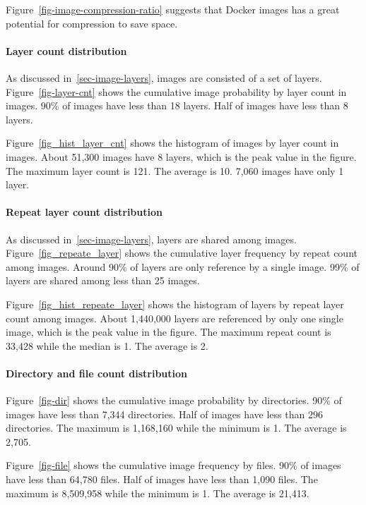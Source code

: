 Figure~\ref{fig-image-compression-ratio} suggests that Docker images has a great potential for compression to save space.
\paragraph{Layer count distribution}



As discussed in~\ref{sec-image-layers}, images are consisted of a set of layers. Figure~\ref{fig-layer-cnt} shows the cumulative image probability by layer count in images. 90\% of images have less than 18 layers. Half of images have less than 8 layers. 

Figure~\ref{fig_hist_layer_cnt} shows the histogram of images by layer count in images. About 51,300 images have 8 layers, which is the peak value in the figure. The maximum layer count is 121. The average is 10. 7,060 images have only 1 layer. 


\paragraph{Repeat layer count distribution}

As discussed in~\ref{sec-image-layers}, layers are shared among images. Figure~\ref{fig_repeate_layer} shows the cumulative layer frequency by repeat count among images. Around 90\% of layers are only reference by a single image. 99\% of layers are shared among less than 25 images. 

Figure~\ref{fig_hist_repeate_layer} shows the histogram of layers by repeat layer count among images. About 1,440,000 layers are referenced by only one single image, which is the peak value in the figure. The maximum repeat count is 33,428 while the median is 1. The average is 2.
\paragraph{Directory and file count distribution}



Figure~\ref{fig-dir} shows the cumulative image probability by directories. 90\% of images have less than 7,344 directories. Half of images have less than 296 directories. The maximum is 1,168,160 while the minimum is 1. The average is 2,705. 

Figure~\ref{fig-file} shows the cumulative image frequency by files. 90\% of images have less than 64,780 files. Half of images have less than 1,090 files. The maximum is 8,509,958 while the minimum is 1. The average is 21,413.

